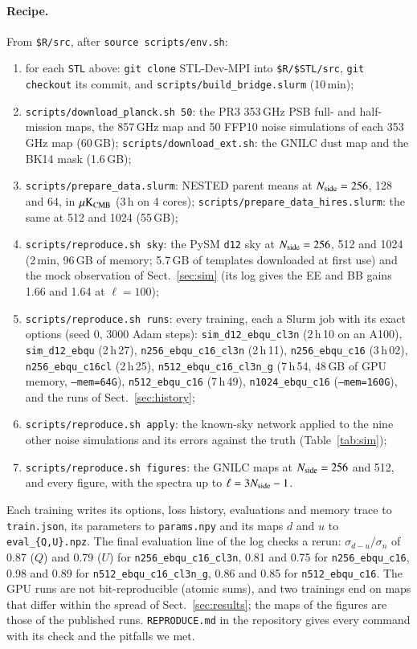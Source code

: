 \documentclass{aa}
\newcommand{\nside}{N_{\rm side}}
\begin{document}
\begin{appendix}
\paragraph{Recipe.} From \texttt{\$R/src}, after \texttt{source scripts/env.sh}:
\begin{enumerate}
  \item for each \texttt{STL} above: \texttt{git clone} STL-Dev-MPI into \texttt{\$R/\$STL/src}, \texttt{git checkout} its commit, and \texttt{scripts/build\_bridge.slurm} (10\,min);
  \item \texttt{scripts/download\_planck.sh 50}: the PR3 353\,GHz PSB full- and half-mission maps, the 857\,GHz map and 50 FFP10 noise simulations of each 353\,GHz map (60\,GB); \texttt{scripts/download\_ext.sh}: the GNILC dust map and the BK14 mask (1.6\,GB);
  \item \texttt{scripts/prepare\_data.slurm}: NESTED parent means at $\nside=256$, 128 and 64, in $\mu{\rm K}_{\rm CMB}$ (3\,h on 4 cores); \texttt{scripts/prepare\_data\_hires.slurm}: the same at 512 and 1024 (55\,GB);
  \item \texttt{scripts/reproduce.sh sky}: the PySM \texttt{d12} sky at $\nside=256$, 512 and 1024 (2\,min, 96\,GB of memory; 5.7\,GB of templates downloaded at first use) and the mock observation of Sect.~\ref{sec:sim} (its log gives the EE and BB gains 1.66 and 1.64 at $\ell=100$);
  \item \texttt{scripts/reproduce.sh runs}: every training, each a Slurm job with its exact options (seed 0, 3000 Adam steps): \texttt{sim\_d12\_ebqu\_cl3n} (2\,h\,10 on an A100), \texttt{sim\_d12\_ebqu} (2\,h\,27), \texttt{n256\_ebqu\_c16\_cl3n} (2\,h\,11), \texttt{n256\_ebqu\_c16} (3\,h\,02), \texttt{n256\_ebqu\_c16cl} (2\,h\,25), \texttt{n512\_ebqu\_c16\_cl3n\_g} (7\,h\,54, 48\,GB of GPU memory, \texttt{--mem=64G}), \texttt{n512\_ebqu\_c16} (7\,h\,49), \texttt{n1024\_ebqu\_c16} (\texttt{--mem=160G}), and the runs of Sect.~\ref{sec:history};
  \item \texttt{scripts/reproduce.sh apply}: the known-sky network applied to the nine other noise simulations and its errors against the truth (Table~\ref{tab:sim});
  \item \texttt{scripts/reproduce.sh figures}: the GNILC maps at $\nside=256$ and 512, and every figure, with the spectra up to $\ell=3\nside-1$.
\end{enumerate}
Each training writes its options, loss history, evaluations and memory trace to \texttt{train.json}, its parameters to \texttt{params.npy} and its maps $d$ and $u$ to \texttt{eval\_\{Q,U\}.npz}. The final evaluation line of the log checks a rerun: $\sigma_{d-u}/\sigma_n$ of 0.87 ($Q$) and 0.79 ($U$) for \texttt{n256\_ebqu\_c16\_cl3n}, 0.81 and 0.75 for \texttt{n256\_ebqu\_c16}, 0.98 and 0.89 for \texttt{n512\_ebqu\_c16\_cl3n\_g}, 0.86 and 0.85 for \texttt{n512\_ebqu\_c16}. The GPU runs are not bit-reproducible (atomic sums), and two trainings end on maps that differ within the spread of Sect.~\ref{sec:results}; the maps of the figures are those of the published runs. \texttt{REPRODUCE.md} in the repository gives every command with its check and the pitfalls we met.

\end{appendix}
\end{document}

